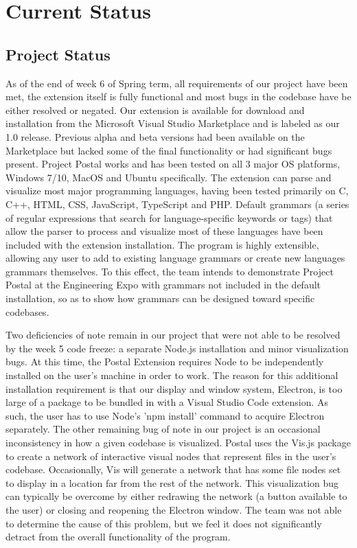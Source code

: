 \documentclass[letterpaper,10pt,titlepage,draftclsnofoot,onecolumn,onesided] {IEEEtran}
\begin{document}
\section{Current Status}
	\subsection{Project Status}
	As of the end of week 6 of Spring term, all requirements of our project have been met, the extension itself is fully functional and most bugs in the codebase have be either resolved or negated.
	Our extension is available for download and installation from the Microsoft Visual Studio Marketplace and is labeled as our 1.0 release. 
	Previous alpha and beta versions had been available on the Marketplace but lacked some of the final functionality or had significant bugs present.
	Project Postal works and has been tested on all 3 major OS platforms, Windows 7/10, MacOS and Ubuntu specifically.
	The extension can parse and visualize most major programming languages, having been tested primarily on C, C++, HTML, CSS, JavaScript, TypeScript and PHP.
	Default grammars (a series of regular expressions that search for language-specific keywords or tags) that allow the parser to process and visualize most of these languages have been included with the extension installation.
	The program is highly extensible, allowing any user to add to existing language grammars or create new languages grammars themselves.
	To this effect, the team intends to demonstrate Project Postal at the Engineering Expo with grammars not included in the default installation, so as to show how grammars can be designed toward specific codebases.
	
	Two deficiencies of note remain in our project that were not able to be resolved by the week 5 code freeze: a separate Node.js installation and minor visualization bugs.
	At this time, the Postal Extension requires Node to be independently installed on the user's machine in order to work. 
	The reason for this additional installation requirement is that our display and window system, Electron, is too large of a package to be bundled in with a Visual Studio Code extension.
	As such, the user has to use Node's 'npm install' command to acquire Electron separately.
	The other remaining bug of note in our project is an occasional inconsistency in how a given codebase is visualized.
	Postal uses the Vis.js package to create a network of interactive visual nodes that represent files in the user's codebase.
	Occasionally, Vis will generate a network that has some file nodes set to display in a location far from the rest of the network.
	This visualization bug can typically be overcome by either redrawing the network (a button available to the user) or closing and reopening the Electron window.
	The team was not able to determine the cause of this problem, but we feel it does not significantly detract from the overall functionality of the program.
	
\end{document}
